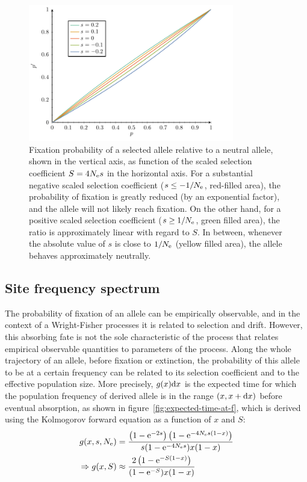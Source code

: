 \begin{figure}[H]
    \centering
    \includegraphics[width=0.8\textwidth, page=2] {figures.pdf}
    \caption[Relative fixation probability]{
    Fixation probability of a selected \gls{allele} relative to a \gls{neutral} \gls{allele}, shown in the vertical axis, as function of the scaled selection coefficient $S=4 N_{\text{e}} s$ in the horizontal axis.
    For a substantial negative scaled selection coefficient ($s \leq -1/N_{\text{e}}$, red-filled area), the probability of fixation is greatly reduced (by an exponential factor), and the \gls{allele} will not likely reach fixation.
    On the other hand, for a positive scaled selection coefficient ($s \geq 1 / N_{\text{e}}$, green filled area), the ratio is approximately linear with regard to $S$.
    In between, whenever the absolute value of $s$ is close to $1 / N_{\text{e}}$ (yellow filled area), the \gls{allele} behaves approximately neutrally.}
    \label{fig:relative-fixation-probability}
\end{figure}

\subsection{Site frequency spectrum}
The probability of fixation of an \gls{allele} can be empirically observable, and in the context of a Wright-Fisher processes it is related to selection and drift.
However, this absorbing fate is not the sole characteristic of the process that relates empirical observable quantities to parameters of the process.
Along the whole trajectory of an \gls{allele}, before fixation or extinction, the probability of this \gls{allele} to be at a certain frequency can be related to its selection coefficient and to the \gls{effective population size}.
More precisely, $g(x) \mathrm{d} x $ is the expected time for which the population frequency of derived \gls{allele} is in the range $(x, x+\mathrm{d} x)$ before eventual absorption, as shown in figure~\ref{fig:expected-time-at-f}, which is derived using the Kolmogorov forward equation as a function of $x$ and $S$:
\begin{align}
    g(x, s, N_{\text{e}}) & = \dfrac{\left( 1 - \text{e}^{- 2 s }\right) \left( 1 - \text{e}^{-4 N_{\text{e}} s(1-x)}\right)}{ s (1 - \text{e}^{-4 N_{\text{e}} s})x(1-x)} \\
    \Rightarrow g(x, S) & \approx \dfrac{2 \left( 1 - \text{e}^{-S(1-x)}\right)}{(1 - \text{e}^{-S})x(1-x)} \label{eq:expected_time}
\end{align}

